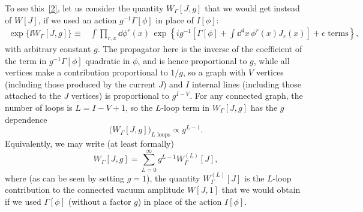 To see this~\hyperref[ch16-ref-2]{[2]}, let us consider the quantity $W_\Gamma[J,g]$ that we would get
instead of $W[J]$, if we used an action $g^{-1}\Gamma[\phi]$ in place of $I[\phi]$:
\begin{align}
\exp\{\ii W_\Gamma[J,g]\}
\equiv{}&\int\prod_{r,x}\dd\phi^r(x)\,
\exp\!\left\{ig^{-1}\left[\Gamma[\phi]+\int \dd^4x\,\phi^r(x)J_r(x)\right]
+\epsilon\text{ terms}\right\},
\label{eq:16.1.9}
\end{align}
with arbitrary constant $g$. The propagator here is the inverse of the
coefficient of the term in $g^{-1}\Gamma[\phi]$ quadratic in $\phi$, and is hence proportional
to $g$, while all vertices make a contribution proportional to $1/g$, so a graph
with $V$ vertices (including those produced by the current $J$) and $I$ internal
lines (including those attached to the $J$ vertices) is proportional to $g^{I-V}$.
For any connected graph, the number of loops is $L=I-V+1$, so the
$L$-loop term in $W_\Gamma[J,g]$ has the $g$ dependence
\begin{equation}
\bigl(W_\Gamma[J,g]\bigr)_{L\text{ loops}}\propto g^{L-1}.
\label{eq:16.1.10}
\end{equation}
Equivalently, we may write (at least formally)
\begin{equation}
W_\Gamma[J,g]=\sum_{L=0}^{\infty}g^{L-1}W_\Gamma^{(L)}[J],
\label{eq:16.1.11}
\end{equation}
where (as can be seen by setting $g=1$), the quantity $W_\Gamma^{(L)}[J]$ is the $L$-loop
contribution to the connected vacuum amplitude $W[J,1]$ that we would
obtain if we used $\Gamma[\phi]$ (without a factor $g$) in place of the action $I[\phi]$.

